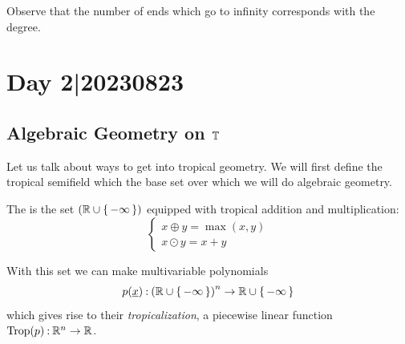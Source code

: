 \documentclass[12pt]{memoir}
\DeclareMathOperator{\Trop}{Trop}
\begin{document}
Observe that the number of ends which go to infinity corresponds with the degree. 

\section{Day 2|20230823}
\subsection{Algebraic Geometry on $\mathbb{T}$}
Let us talk about ways to get into tropical geometry. We will first define the tropical semifield which the base set over which we will do algebraic geometry.

\begin{Def}
    The  is the set $(\mathbb{R}\cup\{\,-\infty\,\})$ equipped with tropical addition and multiplication:
    $$
    \begin{cases}
        x\oplus y=\max(x,y)\\
        x\odot y=x+y
    \end{cases}
    $$
\end{Def}

With this set we can make multivariable polynomials 
$$p(\underline x)\mathbin{:}\left(\mathbb{R}\cup\{\,-\infty\,\}\right)^n\to\mathbb{R}\cup\{\,-\infty\,\}$$
which gives rise to their \emph{tropicalization}, a piecewise linear function $\Trop(p)\:\bR^n\to\bR$.
\end{document}

